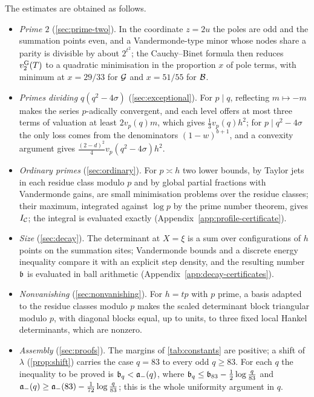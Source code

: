 The estimates are obtained as follows.
\begin{itemize}
\item \emph{Prime $2$} (\cref{sec:prime-two}). In the coordinate $z=2u$ the poles are odd and
the summation points even, and a Vandermonde-type minor whose nodes share a parity is divisible by
about $2^{t^2}$; the Cauchy--Binet formula then reduces $v_{2}^{\mathrm{G}}(T)$ to a quadratic minimisation in
the proportion $x$ of pole terms, with minimum at $x=29/33$ for $\mathcal{G}$ and $x=51/55$ for $\mathcal{B}$.
\item \emph{Primes dividing $q(q^2-4\sigma)$} (\cref{sec:exceptional}). For $p\mid q$, reflecting
$m\mapsto-m$ makes the series $p$-adically convergent, and each level offers at most three terms
of valuation at least $2v_p(q)m$, which gives $\frac13v_p(q)h^2$; for $p\mid q^2-4\sigma$ the only
loss comes from the denominators $(1-w)^{b+1}$, and a convexity argument gives
$\frac{(2-d)^2}4v_p(q^2-4\sigma)h^2$.
\item \emph{Ordinary primes} (\cref{sec:ordinary}). For $p\asymp h$ two lower bounds, by Taylor
jets in each residue class modulo $p$ and by global partial fractions with Vandermonde gains, are
small minimisation problems over the residue classes; their maximum, integrated against $\log p$
by the prime number theorem, gives $I_{\mathcal C}$; the integral is evaluated exactly (Appendix~\ref{app:profile-certificate}).
\item \emph{Size} (\cref{sec:decay}). The determinant at $X=\xi$ is a sum over configurations of
$h$ points on the summation sites; Vandermonde bounds and a discrete energy inequality compare it
with an explicit step density, and the resulting number $\mathfrak{b}$ is evaluated in ball arithmetic
(Appendix~\ref{app:decay-certificates}).
\item \emph{Nonvanishing} (\cref{sec:nonvanishing}). For $h=tp$ with $p$ prime, a basis adapted
to the residue classes modulo $p$ makes the scaled determinant block triangular modulo $p$, with
diagonal blocks equal, up to units, to three fixed local Hankel determinants, which are nonzero.
\item \emph{Assembly} (\cref{sec:proofs}). The margins of \cref{tab:constants} are positive; a
shift of $\lambda$ (\cref{prop:shift}) carries the case $q=83$ to every odd $q\ge83$. For each $q$
the inequality to be proved is $\mathfrak{b}_q<\mathfrak{a}_-(q)$, where $\mathfrak{b}_q\le\mathfrak{b}_{83}-\frac12\log\frac q{83}$
and $\mathfrak{a}_-(q)\ge\mathfrak{a}_-(83)-\frac1{72}\log\frac q{83}$; this is the whole uniformity
argument in $q$.
\end{itemize}

